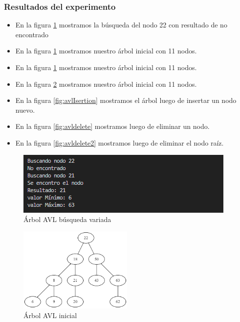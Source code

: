 \documentclass{article}
\begin{document}
         \subsubsection{Resultados del experimento}
         \begin{itemize}
            \item En la figura \ref{fig:avlBusqueda} mostramos la búsqueda del nodo 22 con resultado de no encontrado
           \item En la figura \ref{fig:avlBusqueda} mostramos nuestro árbol inicial con 11 nodos.
           \item En la figura \ref{fig:avlBusqueda} mostramos nuestro árbol inicial con 11 nodos.

           \item En la figura \ref{fig:avlInicial} mostramos nuestro árbol inicial con 11 nodos.
           \item En la figura \ref{fig:avlIsertion} mostramos el árbol luego de insertar un nodo nuevo.
           \item En la figura \ref{fig:avldelete} mostramos luego de eliminar un nodo.
           \item En la figura \ref{fig:avldelete2} mostramos luego de eliminar el nodo raíz.
         \end{itemize}
         \begin{figure}[htbp]
              \centering
              \includegraphics[width=\textwidth]{img/busquedaAVL.png}
              \caption{Árbol AVL búsqueda variada}
              \label{fig:avlBusqueda}
            \end{figure}
            \begin{figure}[htbp]
              \centering
              \includegraphics[width=0.5\textwidth]{img/avltree.png}
              \caption{Árbol AVL inicial}
              \label{fig:avlInicial}
            \end{figure}
\end{document}
